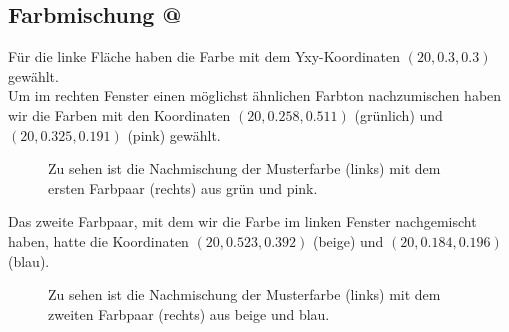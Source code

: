 \documentclass[11pt]{article}
\makeatletter
\newcommand*{\rom}[1]{\expandafter\@slowromancap\romannumeral #1@}
\makeatother
\begin{document}
\subsection{Farbmischung \rom{2}}
Für die linke Fläche haben die Farbe mit dem Yxy-Koordinaten $(20,0.3,0.3)$ gewählt. \\
Um im rechten Fenster einen möglichst ähnlichen Farbton nachzumischen haben wir die Farben mit den Koordinaten $(20,0.258, 0.511)$ (grünlich) und $(20,0.325, 0.191)$ (pink) gewählt. 


\begin{figure}[H]
\caption{Zu sehen ist die Nachmischung der Musterfarbe (links) mit dem ersten Farbpaar (rechts) aus grün und pink.}
\label{meta1}
\end{figure}


Das zweite Farbpaar, mit dem wir die Farbe im linken Fenster nachgemischt haben, hatte die Koordinaten $(20,0.523, 0.392)$ (beige) und $(20,0.184, 0.196)$ (blau). 

\begin{figure}[H]
\caption{Zu sehen ist die Nachmischung der Musterfarbe (links) mit dem zweiten Farbpaar (rechts) aus beige und blau.}
\label{meta2}
\end{figure}
\end{document}
